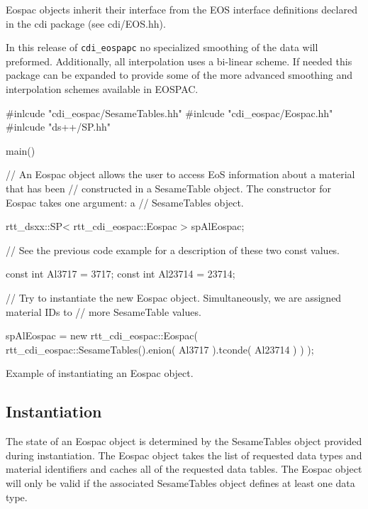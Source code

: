 \documentclass[11pt]{nmemo}
\newenvironment{codeExample}
{\footnotesize 
  \VerbatimEnvironment
  \begin{SaveVerbatim}{\mycode}}%
  {\end{SaveVerbatim}%
  \noindent%
  \parashade[.950]{sharpcorners}{\gdef\outlineboxwidth{.5}%
    \UseVerbatim{\mycode}}\normalsize}
\begin{document}
Eospac objects inherit their interface from the EOS interface
definitions declared in the cdi package (see cdi/EOS.hh).

In this release of \texttt{cdi\_eospapc} no specialized smoothing of
the data will preformed.  Additionally, all interpolation uses a
bi-linear scheme.  If needed this package can be expanded to provide
some of the more advanced smoothing and interpolation schemes
available in EOSPAC.



\begin{cxxSampleCode}
\begin{codeExample}
#inlcude "cdi_eospac/SesameTables.hh"
#inlcude "cdi_eospac/Eospac.hh"
#inlcude "ds++/SP.hh"

main()
{
  // An Eospac object allows the user to access EoS information about a material that has been 
  // constructed in a SesameTable object.  The constructor for Eospac takes one argument: a 
  // SesameTables object.
  
  rtt_dsxx::SP< rtt_cdi_eospac::Eospac > spAlEospac;

  // See the previous code example for a description of these two const values.

  const int Al3717  = 3717; const int Al23714 = 23714;

  // Try to instantiate the new Eospac object.  Simultaneously, we are assigned material IDs to
  // more SesameTable values.    
  
  spAlEospac = new 
    rtt_cdi_eospac::Eospac( rtt_cdi_eospac::SesameTables().enion( Al3717 ).tconde( Al23714 ) ) );
 } 
\end{codeExample}
\caption{Example of instantiating an Eospac object.}
\label{codeExample:EospacInstantiation}
\end{cxxSampleCode}

\subsection{Instantiation}

The state of an Eospac object is determined by the SesameTables object
provided during instantiation.  The Eospac object takes the list of
requested data types and material identifiers and caches all of the
requested data tables.  The Eospac object will only be valid if the
associated SesameTables object defines at least one data type.
\end{document}
